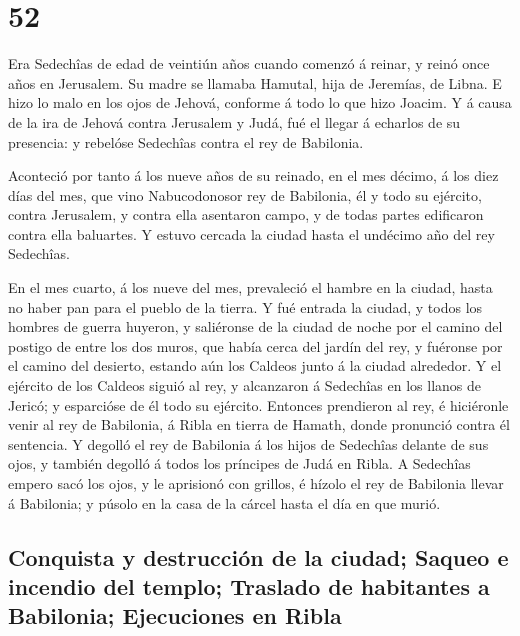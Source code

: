 \hypertarget{section-51}{%
\section{52}\label{section-51}}

 Era Sedechîas de edad de veintiún años cuando comenzó á
reinar, y reinó once años en Jerusalem. Su madre se llamaba Hamutal,
hija de Jeremías, de Libna.  E hizo lo malo en los ojos de
Jehová, conforme á todo lo que hizo Joacim.  Y á causa de la
ira de Jehová contra Jerusalem y Judá, fué el llegar á echarlos de su
presencia: y rebelóse Sedechîas contra el rey de Babilonia.

 Aconteció por tanto á los nueve años de su reinado, en el
mes décimo, á los diez días del mes, que vino Nabucodonosor rey de
Babilonia, él y todo su ejército, contra Jerusalem, y contra ella
asentaron campo, y de todas partes edificaron contra ella baluartes.
 Y estuvo cercada la ciudad hasta el undécimo año del rey
Sedechîas.

 En el mes cuarto, á los nueve del mes, prevaleció el hambre
en la ciudad, hasta no haber pan para el pueblo de la tierra.
 Y fué entrada la ciudad, y todos los hombres de guerra
huyeron, y saliéronse de la ciudad de noche por el camino del postigo de
entre los dos muros, que había cerca del jardín del rey, y fuéronse por
el camino del desierto, estando aún los Caldeos junto á la ciudad
alrededor.  Y el ejército de los Caldeos siguió al rey, y
alcanzaron á Sedechîas en los llanos de Jericó; y esparcióse de él todo
su ejército.  Entonces prendieron al rey, é hiciéronle venir
al rey de Babilonia, á Ribla en tierra de Hamath, donde pronunció contra
él sentencia.  Y degolló el rey de Babilonia á los hijos de
Sedechîas delante de sus ojos, y también degolló á todos los príncipes
de Judá en Ribla.  A Sedechîas empero sacó los ojos, y le
aprisionó con grillos, é hízolo el rey de Babilonia llevar á Babilonia;
y púsolo en la casa de la cárcel hasta el día en que murió.

\hypertarget{conquista-y-destrucciuxf3n-de-la-ciudad-saqueo-e-incendio-del-templo-traslado-de-habitantes-a-babilonia-ejecuciones-en-ribla}{%
\subsection{Conquista y destrucción de la ciudad; Saqueo e incendio del
templo; Traslado de habitantes a Babilonia; Ejecuciones en
Ribla}\label{conquista-y-destrucciuxf3n-de-la-ciudad-saqueo-e-incendio-del-templo-traslado-de-habitantes-a-babilonia-ejecuciones-en-ribla}}

